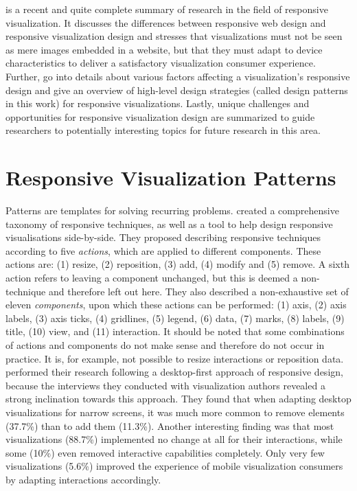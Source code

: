 \textcite{Horak-2021-Responsive-Vis} is a recent and quite complete
summary of research in the field of responsive visualization. It
discusses the differences between responsive web design and responsive
visualization design and stresses that visualizations must not be seen
as mere images embedded in a website, but that they must adapt to
device characteristics to deliver a satisfactory visualization
consumer experience. Further, \textcite{Horak-2021-Responsive-Vis} go
into details about various factors affecting a visualization's
responsive design and give an overview of high-level design strategies
(called design patterns in this work) for responsive
visualizations. Lastly, unique challenges and opportunities for
responsive visualization design are summarized to guide researchers to
potentially interesting topics for future research in this area.





\section{Responsive Visualization Patterns}

Patterns are templates for solving recurring problems.
\textcite{TechniquesForFlexibleRespVisDesign} created a comprehensive
taxonomy of responsive techniques, as well as a tool to help design
responsive visualisations side-by-side. They proposed describing
responsive techniques according to five \emph{actions}, which are
applied to different components. These actions are: (1) resize, (2)
reposition, (3) add, (4) modify and (5) remove. A sixth action refers
to leaving a component unchanged, but this is deemed a non-technique
and therefore left out here. They also described a non-exhaustive set
of eleven \emph{components}, upon which these actions can be
performed: (1) axis, (2) axis labels, (3) axis ticks, (4) gridlines,
(5) legend, (6) data, (7) marks, (8) labels, (9) title, (10) view, and
(11) interaction. It should be noted that some combinations of actions
and components do not make sense and therefore do not occur in
practice. It is, for example, not possible to resize interactions or
reposition data. \textcite{TechniquesForFlexibleRespVisDesign}
performed their research following a desktop-first approach of
responsive design, because the interviews they conducted with
visualization authors revealed a strong inclination towards this
approach. They found that when adapting desktop visualizations for
narrow screens, it was much more common to remove elements (37.7\%)
than to add them (11.3\%). Another interesting finding was that most
visualizations (88.7\%) implemented no change at all for their
interactions, while some (10\%) even removed interactive capabilities
completely. Only very few visualizations (5.6\%) improved the
experience of mobile visualization consumers by adapting interactions
accordingly.



